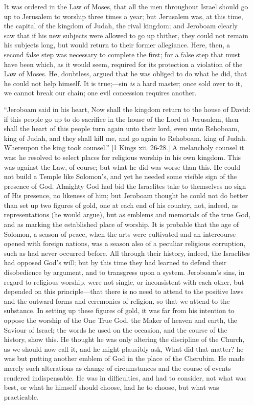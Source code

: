 It was ordered in the Law of Moses, that all the men throughout
Israel should go up to Jerusalem to worship three times a year; but
Jerusalem was, at this time, the capital of the kingdom of Judah, the
rival kingdom; and Jeroboam clearly saw that if his new subjects were
allowed to go up thither, they could not remain his subjects long, but
would return to their former allegiance. Here, then, a second false
step was necessary to complete the first; for a false step that must
have been which, as it would seem, required for its protection a
violation of the Law of Moses. He, doubtless, argued that he was
obliged to do what he did, that he could not help himself. It is true;—sin
\emph{is} a hard master; once sold over to it, we cannot break our
chain; one evil concession requires another.

``Jeroboam said in his heart, Now shall the kingdom return to
the house of David: if this people go up to do sacrifice in the house of
the Lord at Jerusalem, then shall the heart of this people turn again
unto their lord, even unto Rehoboam, king of Judah, and they shall
kill me, and go again to Rehoboam, king of Judah. Whereupon the king
took counsel.'' [1 Kings xii. 26-28.] A melancholy counsel it was:
he resolved to select places for religious worship in his own kingdom.
This was against the Law, of course; but what he did was worse than
this. He could not build a Temple like Solomon's, and yet he needed
some visible sign of the presence of God. Almighty God had bid the
Israelites take to themselves no sign of His presence, no likeness of
him; but Jeroboam thought he could not do better than set up two
figures of gold, one at each end of his country, not, indeed, as
representations (he would argue), but as emblems and memorials of the
true God, and as marking the established place of worship. It is
probable that the age of Solomon, a season of peace, when the arts
were cultivated and an intercourse opened with foreign nations, was a
season also of a peculiar religious corruption, such as had never
occurred before. All through their history, indeed, the Israelites had
opposed God's will; but by this time they had learned to defend
their disobedience by argument, and to transgress upon a system.
Jeroboam's sins, in regard to religious worship, were not single, or
inconsistent with each other, but depended on this principle—that
there is no need to attend to the positive laws and the outward forms
and ceremonies of religion, so that we attend to the substance. In
setting up these figures of gold, it was far from his intention to
oppose the worship of the One True God, the Maker of heaven and earth,
the Saviour of Israel; the words he used on the occasion, and the
course of the history, show this. He thought he was only altering the
discipline of the Church, as we should now call it, and he might
plausibly ask, What did that matter? he was but putting another emblem
of God in the place of the Cherubim. He made merely such alterations
as change of circumstances and the course of events rendered
indispensable. He was in difficulties, and had to consider, not what
was best, or what he himself should choose, had he to choose, but what
was practicable.

